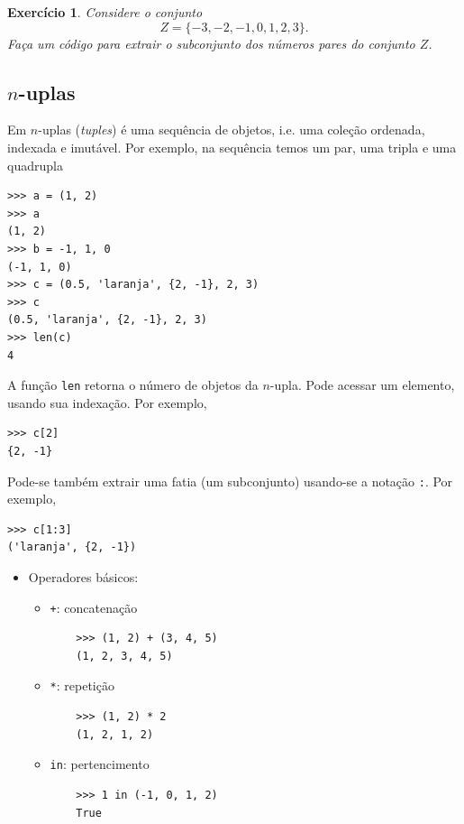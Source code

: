 \documentclass[12pt]{article}
\newtheorem{exr}{Exercício}[section]
\begin{document}
\begin{exr}
  Considere o conjunto
  \begin{equation}
    Z = \{-3, -2, -1, 0, 1, 2, 3\}.
  \end{equation}
  Faça um código {\python} para extrair o subconjunto dos números pares do conjunto $Z$.
\end{exr}

\subsection{$n$-uplas}

Em {\python} $n$-uplas ({\it tuples}) é uma sequência de objetos, i.e. uma coleção ordenada, indexada e imutável. Por exemplo, na sequência temos um par, uma tripla e uma quadrupla
\begin{lstlisting}
>>> a = (1, 2)
>>> a
(1, 2)
>>> b = -1, 1, 0
(-1, 1, 0)
>>> c = (0.5, 'laranja', {2, -1}, 2, 3)
>>> c
(0.5, 'laranja', {2, -1}, 2, 3)
>>> len(c)
4
\end{lstlisting}
A função \lstinline+len+ retorna o número de objetos da $n$-upla. Pode acessar um elemento, usando sua indexação. Por exemplo,
\begin{lstlisting}
>>> c[2]
{2, -1}
\end{lstlisting}
Pode-se também extrair uma fatia (um subconjunto) usando-se a notação \lstinline+:+. Por exemplo,
\begin{lstlisting}
>>> c[1:3]
('laranja', {2, -1})
\end{lstlisting}

\begin{itemize}
\item Operadores básicos:
  \begin{itemize}
  \item[] \lstinline-+-: concatenação
    \begin{lstlisting}
    >>> (1, 2) + (3, 4, 5)
    (1, 2, 3, 4, 5)
    \end{lstlisting}
  \item[] \lstinline+*+: repetição
    \begin{lstlisting}
    >>> (1, 2) * 2
    (1, 2, 1, 2)
    \end{lstlisting}
  \item[] \lstinline+in+: pertencimento
    \begin{lstlisting}
    >>> 1 in (-1, 0, 1, 2)
    True
    \end{lstlisting}
  \end{itemize}
\end{itemize}
\end{document}
